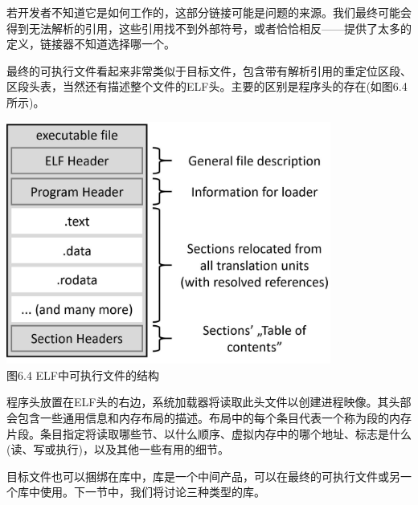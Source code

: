 若开发者不知道它是如何工作的，这部分链接可能是问题的来源。我们最终可能会得到无法解析的引用，这些引用找不到外部符号，或者恰恰相反——提供了太多的定义，链接器不知道选择哪一个。

最终的可执行文件看起来非常类似于目标文件，包含带有解析引用的重定位区段、区段头表，当然还有描述整个文件的ELF头。主要的区别是程序头的存在(如图6.4所示)。

\begin{center}
\includegraphics[width=0.8\textwidth]{content/2/chapter6/images/4.jpg}\\
图6.4  ELF中可执行文件的结构
\end{center}

程序头放置在ELF头的右边，系统加载器将读取此头文件以创建进程映像。其头部会包含一些通用信息和内存布局的描述。布局中的每个条目代表一个称为段的内存片段。条目指定将读取哪些节、以什么顺序、虚拟内存中的哪个地址、标志是什么(读、写或执行)，以及其他一些有用的细节。

目标文件也可以捆绑在库中，库是一个中间产品，可以在最终的可执行文件或另一个库中使用。下一节中，我们将讨论三种类型的库。



